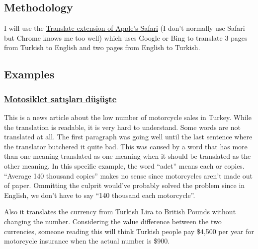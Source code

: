 \documentclass[10pt,letterpaper,bibliography=totoc]{scrartcl}
\begin{document}
\subsection{Methodology}
I will use the \href{https://safari-extensions.apple.com/details/?id=com.sidetree.Translate-S64NDGV2C5}{Translate extension of Apple's Safari} (I don't normally use Safari but Chrome knows me too well) which uses Google or Bing to translate 3 pages from Turkish to English and two pages from English to Turkish. 

\subsection{Examples}
\subsubsection{\href{http://www.motosikletdergisi.com/haber/436/motosiklet-satislari-dususte.html}{Motosiklet satışları düşüşte}}
This is a news article about the low number of motorcycle sales in Turkey. While the translation is readable, it is very hard to understand. Some words are not translated at all. The first paragraph was going well until the last sentence where the translator butchered it quite bad. This was caused by a word that has more than one meaning translated as one meaning when it should be translated as the other meaning. In this specific example, the word ``adet'' means each or copies. ``Average 140 thousand copies'' makes no sense since motorcycles aren't made out of paper. Ommitting the culprit would've probably solved the problem since in English, we don't have to say ``140 thousand each motorcycle''. 

Also it translates the currency from Turkish Lira to British Pounds without changing the number. Considering the value difference between the two currencies, someone reading this will think Turkish people pay \$4,500 per year for motorcycle insurance when the actual number is \$900.
\end{document}
